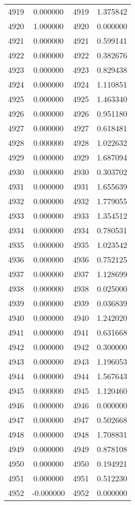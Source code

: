 \documentclass[12pt]{article}
\begin{document}
\begin{longtable}{@{}cccc@{}}
4919 & 0.000000 & 4919 & 1.375842 \\
4920 & 1.000000 & 4920 & 0.000000 \\
4921 & 0.000000 & 4921 & 0.599141 \\
4922 & 0.000000 & 4922 & 0.382676 \\
4923 & 0.000000 & 4923 & 0.829438 \\
4924 & 0.000000 & 4924 & 1.110851 \\
4925 & 0.000000 & 4925 & 1.463340 \\
4926 & 0.000000 & 4926 & 0.951180 \\
4927 & 0.000000 & 4927 & 0.618481 \\
4928 & 0.000000 & 4928 & 1.022632 \\
4929 & 0.000000 & 4929 & 1.687094 \\
4930 & 0.000000 & 4930 & 0.303702 \\
4931 & 0.000000 & 4931 & 1.655639 \\
4932 & 0.000000 & 4932 & 1.779055 \\
4933 & 0.000000 & 4933 & 1.354512 \\
4934 & 0.000000 & 4934 & 0.780531 \\
4935 & 0.000000 & 4935 & 1.023542 \\
4936 & 0.000000 & 4936 & 0.752125 \\
4937 & 0.000000 & 4937 & 1.128699 \\
4938 & 0.000000 & 4938 & 0.025000 \\
4939 & 0.000000 & 4939 & 0.036839 \\
4940 & 0.000000 & 4940 & 1.242020 \\
4941 & 0.000000 & 4941 & 0.631668 \\
4942 & 0.000000 & 4942 & 0.300000 \\
4943 & 0.000000 & 4943 & 1.196053 \\
4944 & 0.000000 & 4944 & 1.567643 \\
4945 & 0.000000 & 4945 & 1.120460 \\
4946 & 0.000000 & 4946 & 0.000000 \\
4947 & 0.000000 & 4947 & 0.502668 \\
4948 & 0.000000 & 4948 & 1.708831 \\
4949 & 0.000000 & 4949 & 0.878108 \\
4950 & 0.000000 & 4950 & 0.194921 \\
4951 & 0.000000 & 4951 & 0.512230 \\
4952 & -0.000000 & 4952 & 0.000000 \\

\end{longtable}
\end{document}
